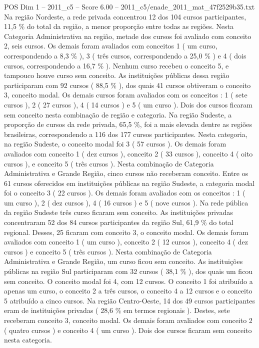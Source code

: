 \begin{textsample}{POS Dim 1 – 2011\_c5 – Score 6.00 – 2011\_c5/enade\_2011\_mat\_47f2529b35.txt}
Na região Nordeste, a rede privada concentrou 12 dos 104 cursos participantes, 11,5 \% do total da região, a menor proporção entre todas as regiões.
Nesta Categoria Administrativa na região, metade dos cursos foi avaliado com conceito 2, seis cursos.
Os demais foram avaliados com conceitos 1 ( um curso, correspondendo a 8,3 \% ), 3 ( três cursos, correspondendo a 25,0 \% ) e 4 ( dois cursos, correspondendo a 16,7 \% ).
Nenhum curso recebeu o conceito 5, e tampouco houve curso sem conceito.
As instituições públicas dessa região participaram com 92 cursos ( 88,5 \% ), dos quais 41 cursos obtiveram o conceito 3, conceito modal.
Os demais cursos foram avaliados com os conceitos : 1 ( sete cursos ), 2 ( 27 cursos ), 4 ( 14 cursos ) e 5 ( um curso ).
Dois dos cursos ficaram sem conceito nesta combinação de região e categoria.
Na região Sudeste, a proporção de cursos da rede privada, 65,5 \%, foi a mais elevada dentre as regiões brasileiras, correspondendo a 116 dos 177 cursos participantes.
Nesta categoria, na região Sudeste, o conceito modal foi 3 ( 57 cursos ).
Os demais foram avaliados com conceito 1 ( dez cursos ), conceito 2 ( 33 cursos ), conceito 4 ( oito cursos ), e conceito 5 ( três cursos ).
Nesta combinação de Categoria Administrativa e Grande Região, cinco cursos não receberam conceito.
Entre os 61 cursos oferecidos em instituições públicas na região Sudeste, a categoria modal foi o conceito 3 ( 22 cursos ).
Os demais foram avaliados com os conceitos : 1 ( um curso ), 2 ( dez cursos ), 4 ( 16 cursos ) e 5 ( nove cursos ).
Na rede pública da região Sudeste três curso ficaram sem conceito.
As instituições privadas concentraram 52 dos 84 cursos participantes da região Sul, 61,9 \% do total regional.
Desses, 25 ficaram com conceito 3, o conceito modal.
Os demais foram avaliados com conceito 1 ( um curso ), conceito 2 ( 12 cursos ), conceito 4 ( dez cursos ) e conceito 5 ( três cursos ).
Nesta combinação de Categoria Administrativa e Grande Região, um curso ficou sem conceito.
As instituições públicas na região Sul participaram com 32 cursos ( 38,1 \% ), dos quais um ficou sem conceito.
O conceito modal foi 4, com 12 cursos.
O conceito 1 foi atribuído a apenas um curso, o conceito 2 a três cursos, o conceito 4 a 12 cursos e o conceito 5 atribuído a cinco cursos.
Na região Centro-Oeste, 14 dos 49 cursos participantes eram de instituições privadas ( 28,6 \% em termos regionais ).
Destes, sete receberam conceito 3, conceito modal.
Os demais foram avaliados com conceito 2 ( quatro cursos ) e conceito 4 ( um curso ).
Dois dos cursos ficaram sem conceito nesta categoria.

\end{textsample}
